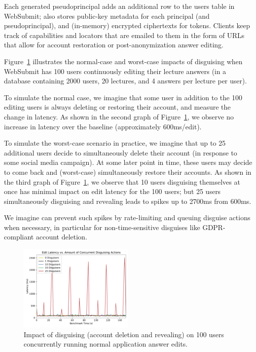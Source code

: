 Each generated pseudoprincipal adds an additional row to the users table in WebSubmit; \sys also stores public-key metadata for each principal (and
pseudoprincipal), and (in-memory) encrypted ciphertexts for tokens.
Clients keep track of capabilities and locators that are emailed to them in the form of URLs that
allow for account restoration or post-anonymization answer editing.

Figure~\ref{fig:concurrent} illustrates the normal-case and worst-case impacts of disguising when
WebSubmit has 100 users continuously editing their lecture answers (in a database containing 2000
users, 20 lectures, and 4 answers per lecture per user).

To simulate the normal case, we imagine that some user in addition to the 100 editing users is
always deleting or restoring their account, and measure the change in latency. As shown in
the second graph of Figure~\ref{fig:concurrent}, we observe no
increase in latency over the baseline (approximately 600ms/edit).

To simulate the worst-case scenario in practice, we imagine that up to 25 additional users decide to
simultaneously delete their account (\eg in response to some social media campaign). At some later
point in time, these users may decide to come back and (worst-case) simultaneously restore their
accounts. As shown in
the third graph of Figure~\ref{fig:concurrent}, we observe that 10 users disguising themselves at once has
minimal impact on edit latency for the 100 users; but 25 users simultaneously disguising and
revealing leads to spikes up to 2700ms from 600ms.

We imagine \sys can prevent such spikes by rate-limiting and queuing disguise actions when
necessary, in particular for non-time-sensitive disguises like GDPR-compliant account deletion.

\begin{figure}[t!]
    \centering
        \includegraphics[width=0.5\textwidth]{figs/concurrent_results_20lec_100users}
    \caption{Impact of disguising (account deletion and revealing) on 100 users concurrently running
    normal application answer edits.} 
    \label{fig:concurrent}
\end{figure}

